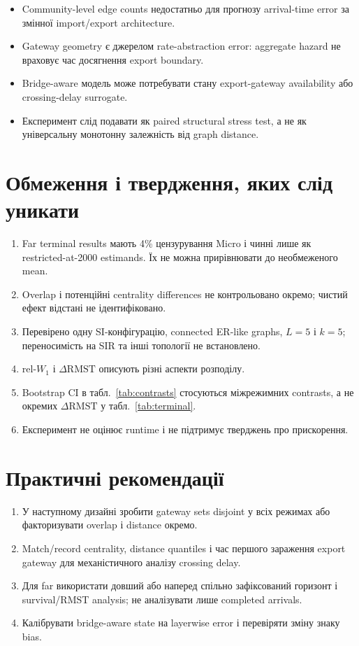\documentclass[11pt,a4paper]{article}
\begin{document}
\begin{itemize}
  \item Community-level edge counts недостатньо для прогнозу arrival-time
  error за змінної import/export architecture.
  \item Gateway geometry є джерелом rate-abstraction error: aggregate hazard
  не враховує час досягнення export boundary.
  \item Bridge-aware модель може потребувати стану export-gateway availability
  або crossing-delay surrogate.
  \item Експеримент слід подавати як paired structural stress test, а не як
  універсальну монотонну залежність від graph distance.
\end{itemize}

\section{Обмеження і твердження, яких слід уникати}\label{sec:limits}

\begin{enumerate}
  \item Far terminal results мають 4\% цензурування Micro і чинні лише як
  restricted-at-2000 estimands. Їх не можна прирівнювати до необмеженого mean.
  \item Overlap і потенційні centrality differences не контрольовано окремо;
  чистий ефект відстані не ідентифіковано.
  \item Перевірено одну SI-конфігурацію, connected ER-like graphs, $L=5$ і
  $k=5$; переносимість на SIR та інші топології не встановлено.
  \item rel-$W_1$ і $\Delta\mathrm{RMST}$ описують різні аспекти розподілу.
  \item Bootstrap CI в табл.~\ref{tab:contrasts} стосуються міжрежимних
  contrasts, а не окремих $\Delta\mathrm{RMST}$ у табл.~\ref{tab:terminal}.
  \item Експеримент не оцінює runtime і не підтримує тверджень про прискорення.
\end{enumerate}

\section{Практичні рекомендації}\label{sec:recommendations}

\begin{enumerate}
  \item У наступному дизайні зробити gateway sets disjoint у всіх режимах або
  факторизувати overlap і distance окремо.
  \item Match/record centrality, distance quantiles і час першого зараження
  export gateway для механістичного аналізу crossing delay.
  \item Для far використати довший або наперед спільно зафіксований горизонт
  і survival/RMST analysis; не аналізувати лише completed arrivals.
  \item Калібрувати bridge-aware state на layerwise error і перевіряти зміну
  знаку bias.
\end{enumerate}
\end{document}
